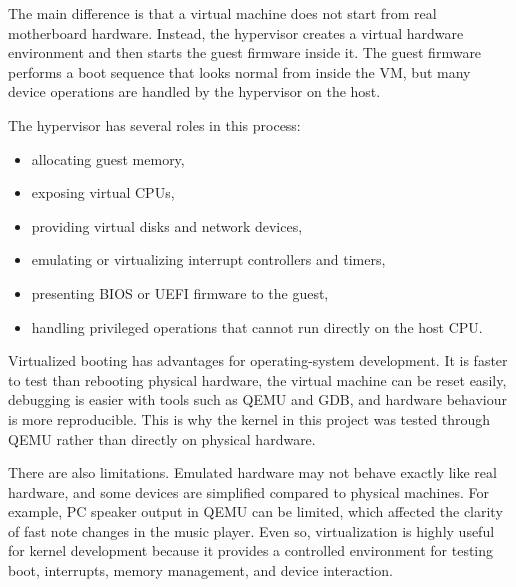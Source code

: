 The main difference is that a virtual machine does not start from real motherboard hardware. Instead, the hypervisor creates a virtual hardware environment and then starts the guest firmware inside it. The guest firmware performs a boot sequence that looks normal from inside the VM, but many device operations are handled by the hypervisor on the host.

The hypervisor has several roles in this process:
\begin{itemize}
  \item allocating guest memory,
  \item exposing virtual CPUs,
  \item providing virtual disks and network devices,
  \item emulating or virtualizing interrupt controllers and timers,
  \item presenting BIOS or UEFI firmware to the guest,
  \item handling privileged operations that cannot run directly on the host CPU.
\end{itemize}

Virtualized booting has advantages for operating-system development. It is faster to test than rebooting physical hardware, the virtual machine can be reset easily, debugging is easier with tools such as QEMU and GDB, and hardware behaviour is more reproducible. This is why the kernel in this project was tested through QEMU rather than directly on physical hardware.

There are also limitations. Emulated hardware may not behave exactly like real hardware, and some devices are simplified compared to physical machines. For example, PC speaker output in QEMU can be limited, which affected the clarity of fast note changes in the music player. Even so, virtualization is highly useful for kernel development because it provides a controlled environment for testing boot, interrupts, memory management, and device interaction.

